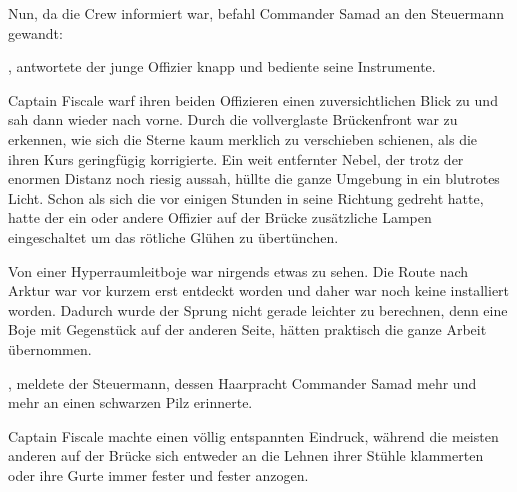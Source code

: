 \par


\par

Nun, da die Crew informiert war, befahl Commander Samad an den Steuermann gewandt: 

\par

, antwortete der junge Offizier knapp und bediente seine Instrumente.

\par

Captain Fiscale warf ihren beiden Offizieren einen zuversichtlichen Blick zu und sah dann wieder nach vorne. Durch die vollverglaste Brückenfront war zu erkennen, wie sich die Sterne kaum merklich zu verschieben schienen, als die  ihren Kurs geringfügig korrigierte. Ein weit entfernter Nebel, der trotz der enormen Distanz noch riesig aussah, hüllte die ganze Umgebung in ein blutrotes Licht. Schon als sich die  vor einigen Stunden in seine Richtung gedreht hatte, hatte der ein oder andere Offizier auf der Brücke zusätzliche Lampen eingeschaltet um das rötliche Glühen zu übertünchen.

\par

Von einer Hyperraumleitboje war nirgends etwas zu sehen. Die Route nach Arktur war vor kurzem erst entdeckt worden und daher war noch keine installiert worden. Dadurch wurde der Sprung nicht gerade leichter zu berechnen, denn eine Boje mit Gegenstück auf der anderen Seite, hätten praktisch die ganze Arbeit übernommen.

\par

, meldete der Steuermann, dessen Haarpracht Commander Samad mehr und mehr an einen schwarzen Pilz erinnerte.

\par

Captain Fiscale machte einen völlig entspannten Eindruck, während die meisten anderen auf der Brücke sich entweder an die Lehnen ihrer Stühle klammerten oder ihre Gurte immer fester und fester anzogen.

\par

